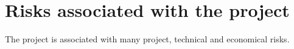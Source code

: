\chapter{Risks associated with the project}
\label{chap:risks}

The project is associated with many project, technical and economical risks.




